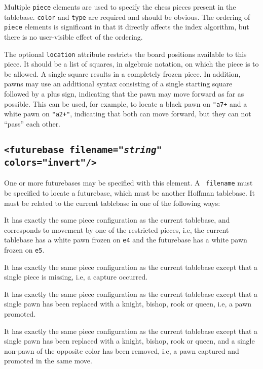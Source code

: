 \documentclass[11pt]{article}
\begin{document}
Multiple {\tt piece} elements are used to specify the chess pieces
present in the tablebase. {\tt color} and {\tt type} are required and
should be obvious.  The ordering of {\tt piece} elements is
significant in that it directly affects the index algorithm,
but there is no user-visible effect of the ordering.

The optional {\tt location} attribute restricts the board positions
available to this piece.  It should be a list of squares, in algebraic
notation, on which the piece is to be allowed.  A single square
results in a completely frozen piece.  In addition, pawns may use an
additional syntax consisting of a single starting square followed by a
plus sign, indicating that the pawn may move forward as far as
possible.  This can be used, for example, to locate a black pawn on
{\tt "a7+} and a white pawn on {\tt "a2+"}, indicating that both can
move forward, but they can not ``pass'' each other.

\subsection{\tt <futurebase filename="{\it string}" colors="invert"/>}

One or more futurebases may be specified with this element.  A {\tt
  filename} must be specified to locate a futurebase, which must be
another Hoffman tablebase.  It must be related to the current
tablebase in one of the following ways:

\begin{description}
\item It has exactly the same piece configuration as the
current tablebase, and corresponds to movement by one of the
restricted pieces, i.e, the current tablebase has a white pawn frozen
on {\tt e4} and the futurebase has a white pawn frozen on {\tt e5}.

\item It has exactly the same piece configuration as
the current tablebase except that a single piece is missing, i.e,
a capture occurred.

\item It has exactly the same piece configuration as the current
tablebase except that a single pawn has been replaced with a knight,
bishop, rook or queen, i.e, a pawn promoted.

\item It has exactly the same piece configuration as the current
tablebase except that a single pawn has been replaced with a knight,
bishop, rook or queen, and a single non-pawn of the opposite color has
been removed, i.e, a pawn captured and promoted in the same move.

\end{description}
\end{document}
